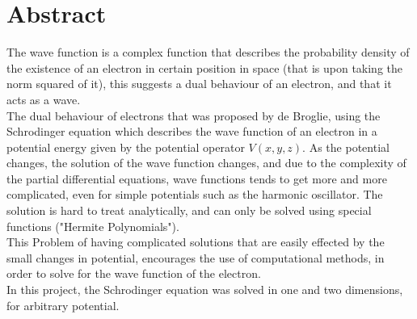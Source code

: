 \documentclass[10pt, a4paper]{article}
\begin{document}
\section{{\Large Abstract}}
    \begin{adjustwidth}{1cm}{}
    The wave function is a complex function that describes the probability density of the existence of an electron in certain position in space (that is upon taking the norm squared of it), this suggests a dual behaviour of an electron, and that it acts as a wave.\\
    The dual behaviour of electrons that was proposed by de Broglie, using the Schrodinger equation which describes the wave function of an electron in a potential energy given by the potential operator $V(x, y, z)$. As the potential changes, the solution of the wave function changes, and due to the complexity of the partial differential equations, wave functions tends to get more and more complicated, even for simple potentials such as the harmonic oscillator. The solution is hard to treat analytically, and can only be solved using special functions ("Hermite Polynomials").\\
    This Problem of having complicated solutions that are easily effected by the small changes in potential, encourages the use of computational methods, in order to solve for the wave function of the electron.\\
    In this project, the Schrodinger equation was solved in one and two dimensions, for arbitrary potential.\\
    \end{adjustwidth}
\end{document}
